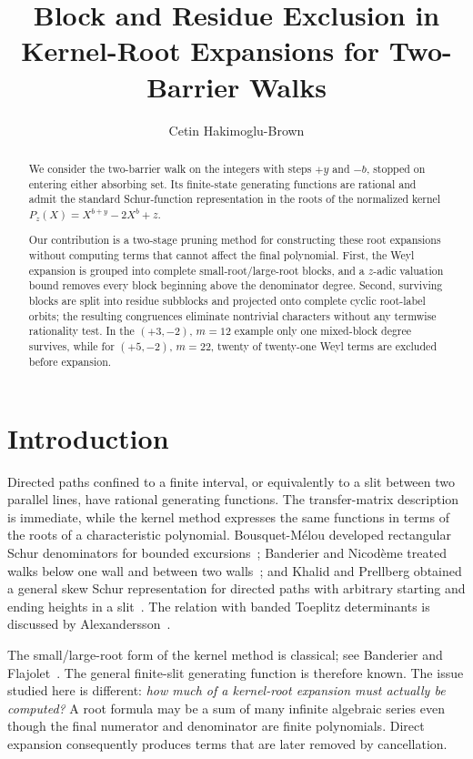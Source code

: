 \documentclass[11pt]{amsart}
\title[Block and residue exclusion]{Block and Residue Exclusion in Kernel-Root Expansions for Two-Barrier Walks}
\author{Cetin Hakimoglu-Brown}
\date{}
\theoremstyle{remark}
\begin{document}
\begin{abstract}
We consider the two-barrier walk on the integers with steps $+y$ and $-b$, stopped on entering either absorbing set. Its finite-state generating functions are rational and admit the standard Schur-function representation in the roots of the normalized kernel $P_z(X)=X^{b+y}-2X^b+z$.

Our contribution is a two-stage pruning method for constructing these root expansions without computing terms that cannot affect the final polynomial. First, the Weyl expansion is grouped into complete small-root/large-root blocks, and a $z$-adic valuation bound removes every block beginning above the denominator degree. Second, surviving blocks are split into residue subblocks and projected onto complete cyclic root-label orbits; the resulting congruences eliminate nontrivial characters without any termwise rationality test. In the $(+3,-2)$, $m=12$ example only one mixed-block degree survives, while for $(+5,-2)$, $m=22$, twenty of twenty-one Weyl terms are excluded before expansion.
\end{abstract}

\maketitle
{}

\section{Introduction}

Directed paths confined to a finite interval, or equivalently to a slit between two parallel lines, have rational generating functions.  The transfer-matrix description is immediate, while the kernel method expresses the same functions in terms of the roots of a characteristic polynomial.  Bousquet-M\'elou developed rectangular Schur denominators for bounded excursions~\cite{BousquetMelou}; Banderier and Nicod\`eme treated walks below one wall and between two walls~\cite{BanderierNicodeme}; and Khalid and Prellberg obtained a general skew Schur representation for directed paths with arbitrary starting and ending heights in a slit~\cite{KhalidPrellberg}.  The relation with banded Toeplitz determinants is discussed by Alexandersson~\cite{Alexandersson}.

The small/large-root form of the kernel method is classical; see Banderier and Flajolet~\cite{BanderierFlajolet}.  The general finite-slit generating function is therefore known.  The issue studied here is different: \emph{how much of a kernel-root expansion must actually be computed?}  A root formula may be a sum of many infinite algebraic series even though the final numerator and denominator are finite polynomials.  Direct expansion consequently produces terms that are later removed by cancellation.
\end{document}
